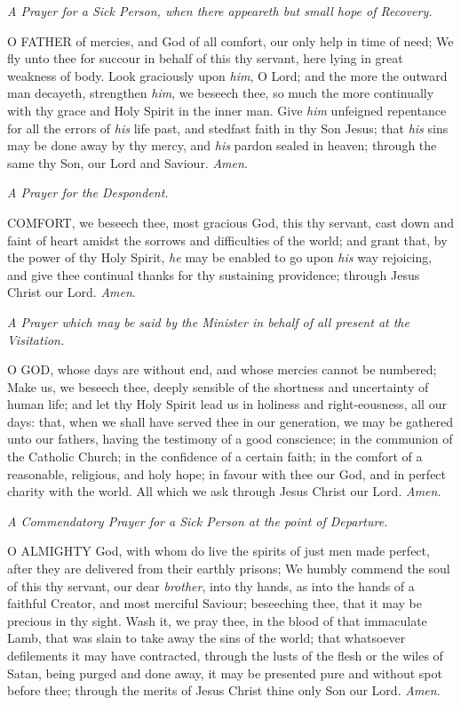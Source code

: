 \emph{A
Prayer for a Sick Person, when there appeareth but small hope of Recovery.}

O
FATHER of mercies, and God of all comfort, our only help in time of need;
We fly unto thee for succour in behalf of this thy servant, here lying
in great weakness of body. Look graciously upon \emph{him}, O Lord;
and the more the outward man decayeth, strengthen \emph{him}, we beseech
thee, so much the more continually with thy grace and Holy Spirit in the
inner man. Give \emph{him} unfeigned repentance for all the errors of
\emph{his} life past, and stedfast faith in thy Son Jesus; that \emph{his}
sins may be done away by thy mercy, and \emph{his} pardon sealed in
heaven; through the same thy Son, our Lord and Saviour. \emph{Amen}.

\emph{A
Prayer for the Despondent.}

COMFORT,
we beseech thee, most gracious God, this thy servant, cast down and faint
of heart amidst the sorrows and difficulties of the world; and grant that,
by the power of thy Holy Spirit, \emph{he} may be enabled to go upon
\emph{his} way rejoicing, and give thee continual thanks for thy sustaining
providence; through Jesus Christ our Lord. \emph{Amen}.

\emph{A Prayer which may be said by the Minister in behalf of all present
at the Visitation.}

O
GOD, whose days are without end, and whose mercies cannot be numbered;
Make us, we beseech thee, deeply sensible of the shortness and uncertainty
of human life; and let thy Holy Spirit lead us in holiness and right-eousness,
all our days: that, when we shall have served thee in our generation,
we may be gathered unto our fathers, having the testimony of a good conscience;
in the communion of the Catholic Church; in the confidence of a certain
faith; in the comfort of a reasonable, religious, and holy hope; in favour
with thee our God, and in perfect charity with the world. All which we
ask through Jesus Christ our Lord. \emph{Amen}.

\emph{A
Commendatory Prayer for a Sick Person at the point of Departure.}

O
ALMIGHTY God, with whom do live the spirits of just men made perfect,
after they are delivered from their earthly prisons; We humbly commend
the soul of this thy servant, our dear \emph{brother}, into thy hands,
as into the hands of a faithful Creator, and most merciful Saviour; beseeching
thee, that it may be precious in thy sight. Wash it, we pray thee, in
the blood of that immaculate Lamb, that was slain to take away the sins
of the world; that whatsoever defilements it may have contracted, through
the lusts of the flesh or the wiles of Satan, being purged and done away,
it may be presented pure and without spot before thee; through the merits
of Jesus Christ thine only Son our Lord. \emph{Amen}.

